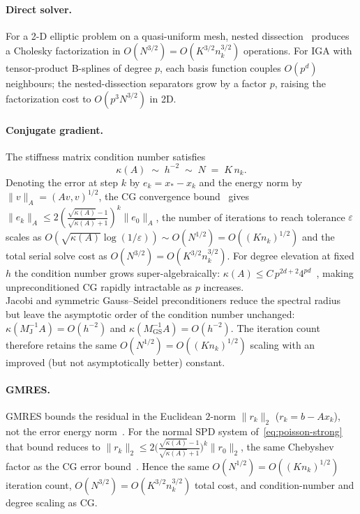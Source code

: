 \documentclass{article}
\theoremstyle{plain}
\numberwithin{equation}{section}
\begin{document}
\paragraph{Direct solver.}
For a 2-D elliptic problem on a quasi-uniform mesh, nested
dissection~\cite[Thm.~4.1]{george1973nested} produces a Cholesky factorization in
$O(N^{3/2}) = O(K^{3/2}n_k^{3/2})$ operations.
For IGA with tensor-product B-splines of degree $p$, each basis function
couples $O(p^d)$ neighbours; the nested-dissection separators grow by a
factor $p$, raising the factorization cost to $O(p^3 N^{3/2})$ in 2D.

\paragraph{Conjugate gradient.}
The stiffness matrix condition number satisfies~\cite[Thm.~4.3]{gahalaut2019condition}
\begin{equation}
    \kappa(A) \;\sim\; h^{-2} \;\sim\; N \;=\; K\,n_k .
    \label{eq:kappa-cg}
\end{equation}
Denoting the error at step $k$ by $e_k = x_*-x_k$ and the
energy norm by $\|v\|_A=(Av,v)^{1/2}$, the CG convergence
bound~\cite[Thm.~6.29]{saad2003iterative} gives
$\|e_k\|_{A} \le 2\!\left(\tfrac{\sqrt{\kappa(A)}-1}{\sqrt{\kappa(A)}+1}\right)^{\!k}\|e_0\|_{A}$,
the number of iterations to reach tolerance $\varepsilon$ scales as
$O\!\left(\sqrt{\kappa(A)}\log(1/\varepsilon)\right)\sim O\!\left(N^{1/2}\right)
    =O\!\left((K n_k)^{1/2}\right)$
and the total serial solve cost as
$O\!\left(N^{3/2}\right)=O\!\left(K^{3/2} n_k^{3/2}\right)$.
For degree elevation at fixed $h$ the condition number grows
super-algebraically: $\kappa(A)\leq C\,p^{2d+2}4^{pd}$~\cite[Thm.~4.8]{gahalaut2019condition},
making unpreconditioned CG rapidly intractable as $p$ increases.
\\
Jacobi and symmetric Gauss--Seidel preconditioners reduce the spectral radius but leave the asymptotic order
of the condition number unchanged:
$\kappa(M_{\mathrm{J}}^{-1}A) = O(h^{-2})$ and
$\kappa(M_{\mathrm{GS}}^{-1}A) = O(h^{-2})$.
The iteration count therefore retains the same
$O\!\left(N^{1/2}\right)=O\!\left((K n_k)^{1/2}\right)$
scaling with an improved (but not asymptotically better) constant.

\paragraph{GMRES.}
GMRES bounds the residual in the Euclidean $2$-norm $\|r_k\|_2$ ($r_k=b-Ax_k$),
not the error energy norm~\cite[Cor.~6.33]{saad2003iterative}. For the normal SPD
system of~\eqref{eq:poisson-strong} that bound reduces to
$\|r_k\|_2\le 2\bigl(\tfrac{\sqrt{\kappa(A)}-1}{\sqrt{\kappa(A)}+1}\bigr)^{k}\|r_0\|_2$,
the same Chebyshev factor as the CG error bound~\cite[Thm.~6.29]{saad2003iterative}.
Hence the same $O\!\left(N^{1/2}\right)=O\!\left((K n_k)^{1/2}\right)$ iteration
count, $O\!\left(N^{3/2}\right)=O\!\left(K^{3/2} n_k^{3/2}\right)$ total cost, and
condition-number and degree scaling as CG.
\end{document}
